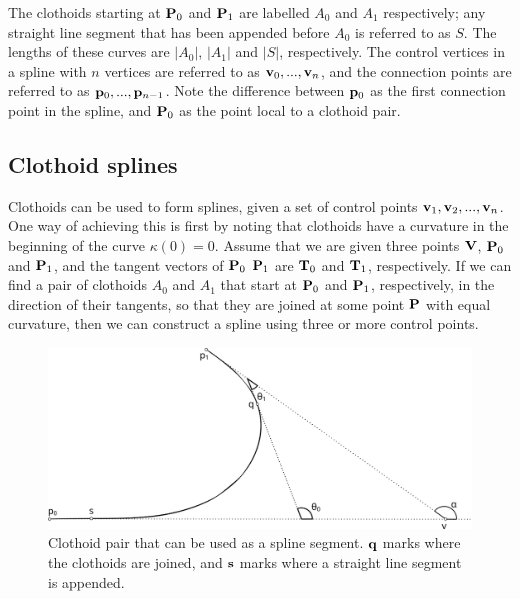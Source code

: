 The clothoids starting at ${\mathbf P}_0$ and ${\mathbf P}_1$ are labelled $A_0$ and $A_1$ respectively; any straight line segment that has been appended before $A_0$ is referred to as $S$. The lengths of these curves are $|A_0|$, $|A_1|$ and $|S|$, respectively. The control vertices in a spline with $n$ vertices are referred to as ${\mathbf v}_0, ..., {\mathbf v}_n$, and the connection points are referred to as ${\mathbf p}_0, ..., {\mathbf p}_{n-1}$. Note the difference between ${\mathbf p}_0$ as the first connection point in the spline, and ${\mathbf P}_0$ as the point local to a clothoid pair.


\subsection{Clothoid splines}
\label{sec:clothoid_spline}
Clothoids can be used to form splines, given a set of control points $\mathbf{v}_1, \mathbf{v}_2, ..., \mathbf{v}_n$.\cite{clothoid} One way of achieving this is first by noting that clothoids have a curvature in the beginning of the curve $\kappa(0) = 0$. Assume that we are given three points $\mathbf{V}$, $\mathbf{P}_0$ and $\mathbf{P}_1$, and the tangent vectors of ${\mathbf P}_0$ ${\mathbf P}_1$ are ${\mathbf T}_0$ and ${\mathbf T}_1$, respectively. If we can find a pair of clothoids $A_0$ and $A_1$ that start at $\mathbf{P}_0$ and $\mathbf{P}_1$, respectively, in the direction of their tangents, so that they are joined at some point $\mathbf{P}$ with equal curvature, then we can construct a spline using three or more control points.\cite{clothoid} 

\begin{figure}[ht]
\centering
\includegraphics[width=\textwidth]{figure/clothoid_pair}
\caption{Clothoid pair that can be used as a spline segment. $\mathbf{q}$ marks where the clothoids are joined, and $\mathbf{s}$ marks where a straight line segment is appended.}
\label{fig:clothoid_pair}
\end{figure}


